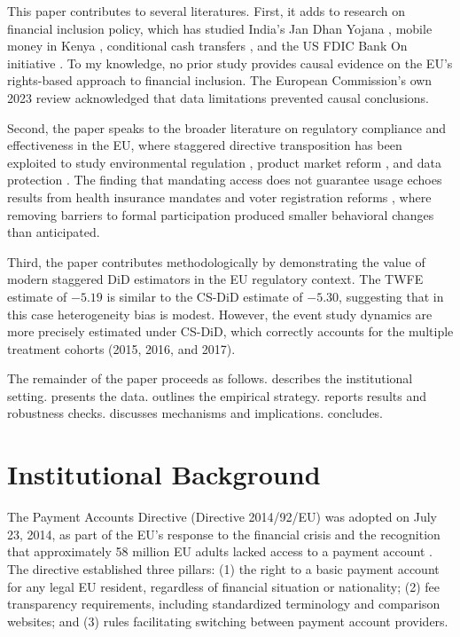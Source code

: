 \documentclass[12pt]{article}
\begin{document}
This paper contributes to several literatures. First, it adds to research on financial inclusion policy, which has studied India's Jan Dhan Yojana \citep{agarwal2017does}, mobile money in Kenya \citep{jack2014risk, suri2017long}, conditional cash transfers \citep{dupas2018banking}, and the US FDIC Bank On initiative \citep{barr2007banking}. To my knowledge, no prior study provides causal evidence on the EU's rights-based approach to financial inclusion. The European Commission's own 2023 review \citep{ec2023pad} acknowledged that data limitations prevented causal conclusions.

Second, the paper speaks to the broader literature on regulatory compliance and effectiveness in the EU, where staggered directive transposition has been exploited to study environmental regulation \citep{misch2022heterogeneous}, product market reform \citep{monteagudo2012economic}, and data protection \citep{goldberg2019gdpr}. The finding that mandating access does not guarantee usage echoes results from health insurance mandates \citep{finkelstein2012oregon} and voter registration reforms \citep{cantoni2020persistent}, where removing barriers to formal participation produced smaller behavioral changes than anticipated.

Third, the paper contributes methodologically by demonstrating the value of modern staggered DiD estimators in the EU regulatory context. The TWFE estimate of $-5.19$ is similar to the CS-DiD estimate of $-5.30$, suggesting that in this case heterogeneity bias is modest. However, the event study dynamics are more precisely estimated under CS-DiD, which correctly accounts for the multiple treatment cohorts (2015, 2016, and 2017).

The remainder of the paper proceeds as follows.  describes the institutional setting.  presents the data.  outlines the empirical strategy.  reports results and robustness checks.  discusses mechanisms and implications.  concludes.


\section{Institutional Background}
\label{sec:background}

The Payment Accounts Directive (Directive 2014/92/EU) was adopted on July 23, 2014, as part of the EU's response to the financial crisis and the recognition that approximately 58 million EU adults lacked access to a payment account \citep{ec2011financial}. The directive established three pillars: (1) the right to a basic payment account for any legal EU resident, regardless of financial situation or nationality; (2) fee transparency requirements, including standardized terminology and comparison websites; and (3) rules facilitating switching between payment account providers.
\end{document}

